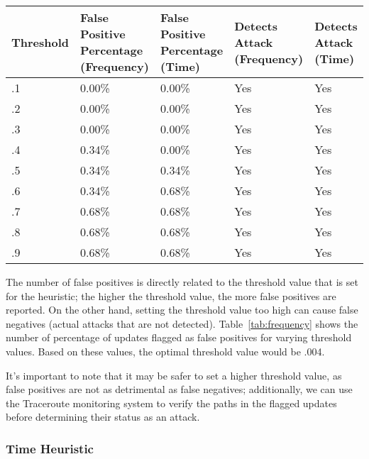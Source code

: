 \begin{table*}[ht!]
\begin{center}
    \begin{tabular}{| p{2cm} | p{3cm} | p{3cm} | p{3cm} | p{2cm} |}
    \hline
    Threshold & False Positive 
Percentage (Frequency) & False Positive 
Percentage (Time) & Detects Attack 
(Frequency) & Detects Attack 
(Time)\\ \hline \hline
    .1 & 0.00\% & 0.00\% & Yes & Yes \\ \hline
    .2 & 0.00\% & 0.00\% & Yes & Yes \\ \hline
    .3 & 0.00\% & 0.00\% & Yes & Yes \\ \hline
    .4 & 0.34\% & 0.00\% & Yes & Yes \\ \hline
    .5 & 0.34\% & 0.34\% & Yes & Yes \\ \hline
    .6 & 0.34\% & 0.68\% & Yes & Yes \\ \hline
    .7 & 0.68\% & 0.68\% & Yes & Yes \\ \hline
    .8 & 0.68\% & 0.68\% & Yes & Yes \\ \hline
    .9 & 0.68\% & 0.68\% & Yes & Yes \\
    \hline
    \end{tabular}
\end{center}
\caption{The false positive rates for different thresholds used in the frequency heuristic.}
\label{tab:frequency}
\end{table*}

The number of false positives is directly related to the threshold value that is set for the heuristic; the higher the threshold value, the more false positives are reported.  On the other hand, setting the threshold value too high can cause false negatives (actual attacks that are not detected).  Table~\ref{tab:frequency} shows the number of percentage of updates flagged as false positives for varying threshold values.  Based on these values, the optimal threshold value would be .004.  

It's important to note that it may be safer to set a higher threshold value, as false positives are not as detrimental as false negatives; additionally, we can use the Traceroute monitoring system to verify the paths in the flagged updates before determining their status as an attack.  

\subsubsection{Time Heuristic}

